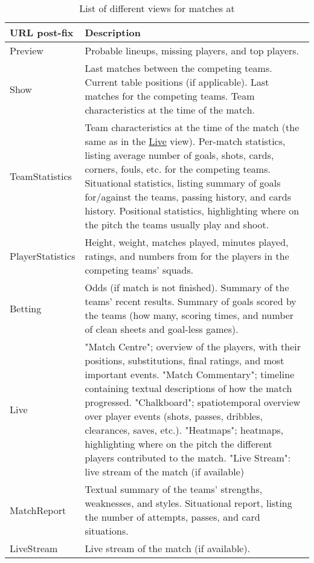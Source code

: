 \begin{table}[H]
    \centering
    \noindent\begin{tabular}{| p{3cm} | p{10cm} |}
        \hline
        \textbf{URL post-fix} & \textbf{Description} \\\hline
        Preview & Probable lineups, missing players, and top players. \\\hline
        Show & Last matches between the competing teams. Current table positions (if applicable). Last matches for the competing teams. Team characteristics at the time of the match. \\\hline
        TeamStatistics & Team characteristics at the time of the match (the same as in the \url{Live} view). Per-match statistics, listing average number of goals, shots, cards, corners, fouls, etc. for the competing teams. Situational statistics, listing summary of goals for/against the teams, passing history, and cards history. Positional statistics, highlighting where on the pitch the teams usually play and shoot. \\\hline
        PlayerStatistics & Height, weight, matches played, minutes played, ratings, and numbers from {tab:whoscored-player-metrics} for the players in the competing teams' squads. \\\hline
        Betting & Odds (if match is not finished). Summary of the teams' recent results. Summary of goals scored by the teams (how many, scoring times, and number of clean sheets and goal-less games). \\\hline
        Live & "Match Centre"; overview of the players, with their positions, substitutions, final ratings, and most important events. "Match Commentary"; timeline containing textual descriptions of how the match progressed. "Chalkboard"; spatiotemporal overview over player events (shots, passes, dribbles, clearances, saves, etc.). "Heatmaps"; heatmaps, highlighting where on the pitch the different players contributed to the match. "Live Stream": live stream of the match (if available) \\\hline
        MatchReport & Textual summary of the teams' strengths, weaknesses, and styles. Situational report, listing the number of attempts, passes, and card situations. \\\hline
        LiveStream & Live stream of the match (if available). \\\hline
    \end{tabular}
    \caption{List of different views for matches at \whoscored}
    \label{tab:whoscored-match-views}
\end{table}

